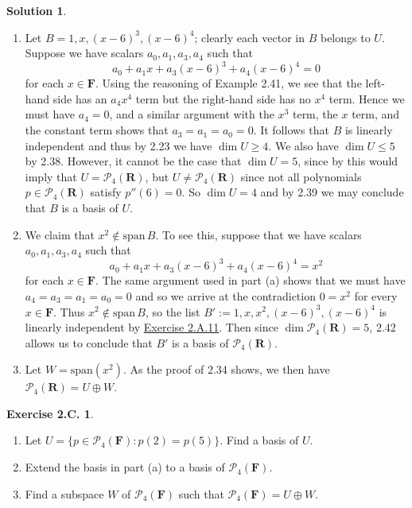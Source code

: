 \documentclass[12pt]{article}
\theoremstyle{definition}
\theoremstyle{exercise}
\newtheorem{exercise}{Exercise 2.C.}
\theoremstyle{solution}
\newtheorem*{solution}{Solution}
\newcommand{\poly}{\mathcal{P}}
\newcommand{\Span}{\text{span}}
\newcommand{\R}{\mathbf{R}}
\newcommand{\F}{\mathbf{F}}
\begin{document}
\begin{solution}
    \begin{enumerate}
        \item Let \( B = 1, x, (x - 6)^3, (x - 6)^4 \); clearly each vector in \( B \) belongs to \( U \). Suppose we have scalars \( a_0, a_1, a_3, a_4 \) such that
        \[
            a_0 + a_1 x + a_3 (x - 6)^3 + a_4 (x - 6)^4 = 0
        \]
        for each \( x \in \F \). Using the reasoning of Example 2.41, we see that the left-hand side has an \( a_4 x^4 \) term but the right-hand side has no \( x^4 \) term. Hence we must have \( a_4 = 0 \), and a similar argument with the \( x^3 \) term, the \( x \) term, and the constant term shows that \( a_3 = a_1 = a_0 = 0 \). It follows that \( B \) is linearly independent and thus by 2.23 we have \( \dim U \geq 4 \). We also have \( \dim U \leq 5 \) by 2.38. However, it cannot be the case that \( \dim U = 5 \), since by  this would imply that \( U = \poly_4(\R) \), but \( U \neq \poly_4(\R) \) since not all polynomials \( p \in \poly_4(\R) \) satisfy \( p''(6) = 0 \). So \( \dim U = 4 \) and by 2.39 we may conclude that \( B \) is a basis of \( U \).

        \item We claim that \( x^2 \not\in \Span\,B \). To see this, suppose that we have scalars \( a_0, a_1, a_3, a_4 \) such that
        \[
            a_0 + a_1 x + a_3 (x - 6)^3 + a_4 (x - 6)^4 = x^2
        \]
        for each \( x \in \F \). The same argument used in part (a) shows that we must have \( a_4 = a_3 = a_1 = a_0 = 0 \) and so we arrive at the contradiction \( 0 = x^2 \) for every \( x \in \F \). Thus \( x^2 \not\in \Span\,B \), so the list \( B' := 1, x, x^2, (x - 6)^3, (x - 6)^4 \) is linearly independent by \href{https://lew98.github.io/Mathematics/LADR_Section_2_A_Exercises.pdf}{Exercise 2.A.11}. Then since \( \dim \poly_4(\R) = 5 \), 2.42 allows us to conclude that \( B' \) is a basis of \( \poly_4(\R) \).

        \item Let \( W = \Span(x^2) \). As the proof of 2.34 shows, we then have \( \poly_4(\R) = U \oplus W \).
    \end{enumerate}
\end{solution}

\begin{exercise}
\label{ex:6}
    \begin{enumerate}
        \item Let \( U = \{ p \in \poly_4(\F) : p(2) = p(5) \} \). Find a basis of \( U \).

        \item Extend the basis in part (a) to a basis of \( \poly_4(\F) \).

        \item Find a subspace \( W \) of \( \poly_4(\F) \) such that \( \poly_4(\F) = U \oplus W \).
    \end{enumerate}
\end{exercise}
    
\end{document}
